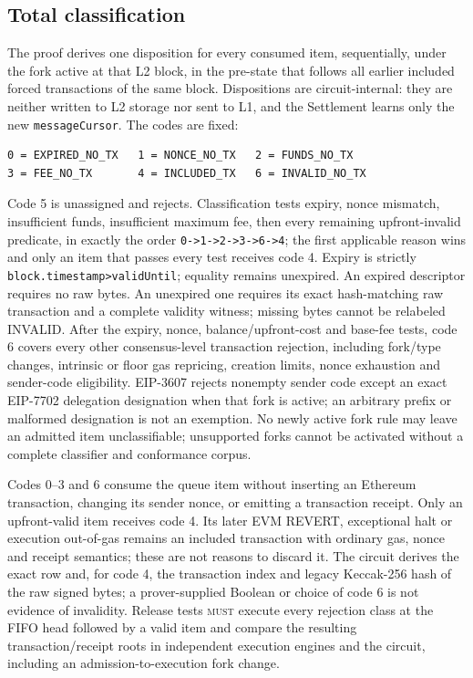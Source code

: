 \documentclass[a4paper,11pt]{article}
\newcommand{\code}[1]{\nolinkurl{#1}}
\newcommand{\must}{\textsc{must}}
\begin{document}
\subsection{Total classification}\label{sec:forced-classification}

The proof derives one disposition for every consumed item, sequentially,
under the fork active at that L2 block, in the pre-state that follows all
earlier included forced transactions of the same block.  Dispositions are
circuit-internal: they are neither written to L2 storage nor sent to L1, and
the Settlement learns only the new \code{messageCursor}.  The codes are
fixed:
\begin{verbatim}
0 = EXPIRED_NO_TX   1 = NONCE_NO_TX   2 = FUNDS_NO_TX
3 = FEE_NO_TX       4 = INCLUDED_TX   6 = INVALID_NO_TX
\end{verbatim}
Code 5 is unassigned and rejects.  Classification tests expiry, nonce
mismatch, insufficient funds, insufficient maximum fee, then every remaining
upfront-invalid predicate, in exactly the order \code{0->1->2->3->6->4}; the
first applicable reason wins and only an item that passes every test
receives code 4.  Expiry is strictly \code{block.timestamp>validUntil};
equality remains unexpired.  An expired descriptor requires no raw bytes.
An unexpired one requires its exact hash-matching raw transaction and a
complete validity witness; missing bytes cannot be relabeled INVALID.  After
the expiry, nonce, balance/upfront-cost and base-fee tests, code 6 covers
every other consensus-level transaction rejection, including fork/type
changes, intrinsic or floor gas repricing, creation limits, nonce exhaustion
and sender-code eligibility.  EIP-3607 rejects nonempty sender code except
an exact EIP-7702 delegation designation when that fork is active; an
arbitrary prefix or malformed designation is not an exemption.  No newly
active fork rule may leave an admitted item unclassifiable; unsupported
forks cannot be activated without a complete classifier and conformance
corpus.

Codes 0--3 and 6 consume the queue item without inserting an Ethereum
transaction, changing its sender nonce, or emitting a transaction receipt.
Only an upfront-valid item receives code 4.  Its later EVM REVERT,
exceptional halt or execution out-of-gas remains an included transaction
with ordinary gas, nonce and receipt semantics; these are not reasons to
discard it.  The circuit derives the exact row and, for code 4, the
transaction index and legacy Keccak-256 hash of the raw signed bytes; a
prover-supplied Boolean or choice of code 6 is not evidence of invalidity.
Release tests \must{} execute every rejection class at the FIFO head
followed by a valid item and compare the resulting transaction/receipt roots
in independent execution engines and the circuit, including an
admission-to-execution fork change.
\end{document}
